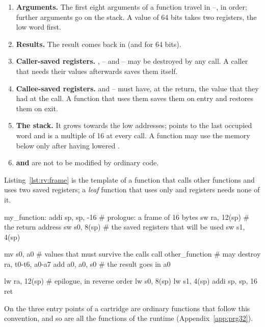 \begin{enumerate}
\item \textbf{Arguments.} The first eight arguments of a function travel in
  --, in order; further arguments go on the stack. A value of
  64 bits takes two registers, the low word first.
\item \textbf{Results.} The result comes back in  (and  for 64
  bits).
\item \textbf{Caller-saved registers.} , -- and
  -- may be destroyed by any call. A caller that needs their
  values afterwards saves them itself.
\item \textbf{Callee-saved registers.}  and -- must
  have, at the return, the value that they had at the call. A function that
  uses them saves them on entry and restores them on exit.
\item \textbf{The stack.} It grows towards the low addresses;  points
  to the last occupied word and is a multiple of 16 at every call. A function
  may use the memory below  only after having lowered .
\item \textbf{ and } are not to be modified by ordinary code.
\end{enumerate}

Listing~\ref{lst:rv:frame} is the template of a function that calls other
functions and uses two saved registers; a \emph{leaf} function that uses only
 and  registers needs none of it.

\begin{asm}[caption={The frame of a non-leaf function.},label=lst:rv:frame]
my_function:
    addi sp, sp, -16        # prologue: a frame of 16 bytes
    sw   ra, 12(sp)         # the return address
    sw   s0, 8(sp)          # the saved registers that will be used
    sw   s1, 4(sp)

    mv   s0, a0             # values that must survive the calls
    call other_function     # may destroy ra, t0-t6, a0-a7
    add  a0, a0, s0         # the result goes in a0

    lw   ra, 12(sp)         # epilogue, in reverse order
    lw   s0, 8(sp)
    lw   s1, 4(sp)
    addi sp, sp, 16
    ret
\end{asm}

On \prg the three entry points of a cartridge are ordinary functions that
follow this convention, and so are all the functions of the runtime
(Appendix~\ref{app:prg32}).


